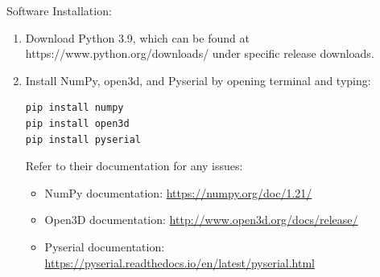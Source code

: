 \documentclass[12pt, letterpaper]{article}
\begin{document}
Software Installation:
\begin{enumerate}
    \item Download Python 3.9, which can be found at https://www.python.org/downloads/ under specific release downloads.
    \item Install NumPy, open3d, and Pyserial by opening terminal and typing:
\begin{verbatim}
pip install numpy
pip install open3d
pip install pyserial
\end{verbatim}
Refer to their documentation for any issues:
\begin{itemize}
\item NumPy documentation: \url{https://numpy.org/doc/1.21/}
\item Open3D documentation: \url{http://www.open3d.org/docs/release/}
\item Pyserial documentation: \url{https://pyserial.readthedocs.io/en/latest/pyserial.html}
\end{itemize}
\end{enumerate}
\end{document}

